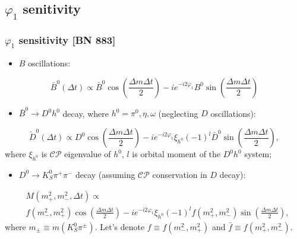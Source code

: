 \documentclass[10 pt,compress,mathserif]{beamer}
\newcommand{\cpconj}{\ensuremath{\mathcal{CP}}\xspace}
\newcommand{\dkspp}{\ensuremath{D^0\to K_S^0\pi^+\pi^-}\xspace}
\begin{document}
\subsection{$\varphi_1$ senitivity}
\begin{frame}
 \frametitle{$\varphi_1$ sensitivity [BN 883]}
 \begin{small}
 \begin{itemize}
  \item $B$ oscillations:
 \end{itemize}
 \begin{equation}
  \bar B^0\left(\Delta t\right) \propto \bar B^0\cos\left(\frac{\Delta m\Delta t}{2}\right)-ie^{-i2\varphi_1}B^0\sin\left(\frac{\Delta m\Delta t}{2}\right)
 \end{equation}
  \begin{itemize}
  \item $\bar B^0\to D^0h^0$ decay, where $h^0 = \pi^0,\eta,\omega$ (neglecting $D$ oscillations):
 \end{itemize}
 \begin{equation}
  \widetilde{D}^0\left(\Delta t\right) \propto D^0\cos\left(\frac{\Delta m\Delta t}{2}\right)-ie^{-i2\varphi_1}\xi_{h^0}(-1)^l\bar D^0\sin\left(\frac{\Delta m\Delta t}{2}\right),
 \end{equation}
  where $\xi_{h^0}$ is \cpconj eigenvalue of $h^0$, $l$ is orbital moment of the $D^0h^0$ system;
 \begin{itemize}
  \item \dkspp decay (assuming \cpconj conservation in $D$ decay):
 \end{itemize}
 \begin{equation}
 \begin{split}
  &M\left(m_+^2,m_-^2,\Delta t\right) \propto\\
  &f\left(m_-^2,m_+^2\right)\cos\left(\frac{\Delta m\Delta t}{2}\right)-ie^{-i2\varphi_1}\xi_{h^0}(-1)^l f\left(m_+^2,m_-^2\right)\sin\left(\frac{\Delta m\Delta t}{2}\right),
 \end{split}
 \end{equation}
 where $m_{\pm} \equiv m\left(K_S^0\pi^{\pm}\right)$. Let's denote $f \equiv f\left(m_-^2,m_+^2\right)$ and $\bar f \equiv f\left(m_+^2,m_-^2\right)$.
 \end{small}
\end{frame}
\end{document}
